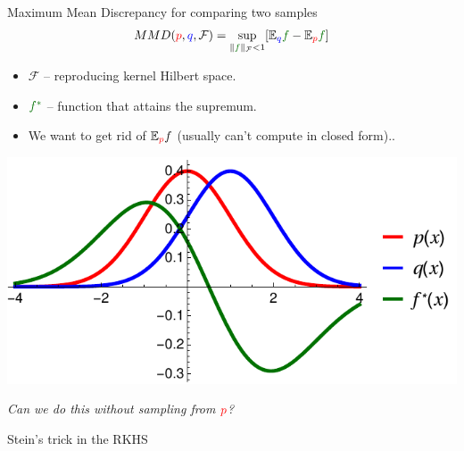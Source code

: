 \begin{frame}
\begin{columns}
\begin{column}{.33\linewidth}
\begin{block}{Maximum Mean Discrepancy for comparing two samples}
{\large\begin{align*}
MMD({\color{red} p},{ \color{blue} q},\mathcal{F}) = \sup_{   \| {\color{mg}f} \|_\mathcal{F}<1} [\ev_{{ \color{blue} q}}{\color{mg}f}- \ev_{{\color{red} p}}{\color{mg} f}]   
\end{align*}}
\begin{minipage}{.60\linewidth}

\vspace{1cm}

\normalsize
\vspace{1cm}
 \begin{itemize}
  \item $\mathcal{F}$ -- reproducing kernel Hilbert space.
  \item ${\color{mg} f^*}$ -- function that attains the supremum.
  \item We want to get rid of  $\mathbb{E}_{ {\color{red} p} }f$ (usually can't compute in closed form)..
 \end{itemize}

\end{minipage}
\begin{minipage}{.35\linewidth}

\begin{center}
\vspace{-1cm}
\hspace{-2.5cm}
\includegraphics[scale=1.0]{../../presentation/img/mmd.pdf}
\end{center}
\end{minipage}
\vspace{1cm}
\begin{center}
{\large\emph{Can we do this without sampling from ${\color{red} p}$?}}
\end{center}
\end{block}
\vspace{-0.75cm}  %
\begin{block}{Stein's trick in the RKHS}


\end{block}
\end{column}
\end{columns}
\end{frame}
